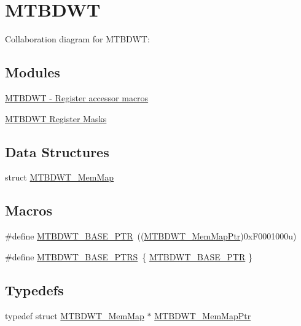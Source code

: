 \hypertarget{group___m_t_b_d_w_t___peripheral}{}\section{M\+T\+B\+D\+WT}
\label{group___m_t_b_d_w_t___peripheral}
Collaboration diagram for M\+T\+B\+D\+WT\+:
\subsection*{Modules}
\begin{DoxyCompactItemize}
\item 
\hyperlink{group___m_t_b_d_w_t___register___accessor___macros}{M\+T\+B\+D\+W\+T -\/ Register accessor macros}
\item 
\hyperlink{group___m_t_b_d_w_t___register___masks}{M\+T\+B\+D\+W\+T Register Masks}
\end{DoxyCompactItemize}
\subsection*{Data Structures}
\begin{DoxyCompactItemize}
\item 
struct \hyperlink{struct_m_t_b_d_w_t___mem_map}{M\+T\+B\+D\+W\+T\+\_\+\+Mem\+Map}
\end{DoxyCompactItemize}
\subsection*{Macros}
\begin{DoxyCompactItemize}
\item 
\#define \hyperlink{group___m_t_b_d_w_t___peripheral_ga97d048bfb5a11293a38c444b8347ff42}{M\+T\+B\+D\+W\+T\+\_\+\+B\+A\+S\+E\+\_\+\+P\+TR}~((\hyperlink{group___m_t_b_d_w_t___peripheral_ga8dd9bf791ed255926ccd995a6236caaf}{M\+T\+B\+D\+W\+T\+\_\+\+Mem\+Map\+Ptr})0x\+F0001000u)
\item 
\#define \hyperlink{group___m_t_b_d_w_t___peripheral_ga0cbd89263cdbe0c07c59ed21112ea9ad}{M\+T\+B\+D\+W\+T\+\_\+\+B\+A\+S\+E\+\_\+\+P\+T\+RS}~\{ \hyperlink{group___m_t_b_d_w_t___peripheral_ga97d048bfb5a11293a38c444b8347ff42}{M\+T\+B\+D\+W\+T\+\_\+\+B\+A\+S\+E\+\_\+\+P\+TR} \}
\end{DoxyCompactItemize}
\subsection*{Typedefs}
\begin{DoxyCompactItemize}
\item 
typedef struct \hyperlink{struct_m_t_b_d_w_t___mem_map}{M\+T\+B\+D\+W\+T\+\_\+\+Mem\+Map} $\ast$ \hyperlink{group___m_t_b_d_w_t___peripheral_ga8dd9bf791ed255926ccd995a6236caaf}{M\+T\+B\+D\+W\+T\+\_\+\+Mem\+Map\+Ptr}
\end{DoxyCompactItemize}


